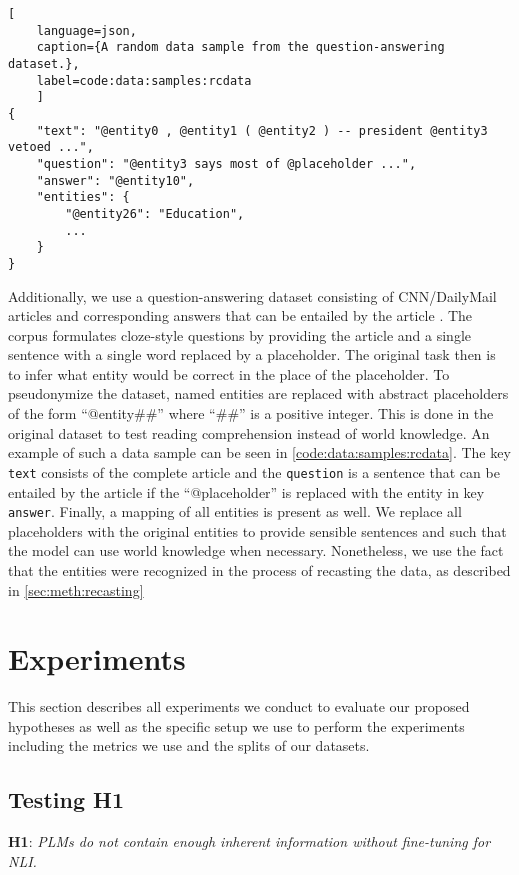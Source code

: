 \begin{lstlisting}[
    language=json,
    caption={A random data sample from the question-answering dataset.},
    label=code:data:samples:rcdata
    ]
{
    "text": "@entity0 , @entity1 ( @entity2 ) -- president @entity3 vetoed ...",
    "question": "@entity3 says most of @placeholder ...",
    "answer": "@entity10",
    "entities": {
        "@entity26": "Education",
        ...
    }
}
\end{lstlisting}

Additionally, we use a question-answering dataset consisting of CNN/DailyMail articles and corresponding answers that can be entailed by the article \cite{cnn1}. The corpus formulates cloze-style questions by providing the article and a single sentence with a single word replaced by a placeholder. The original task then is to infer what entity would be correct in the place of the placeholder. To pseudonymize the dataset, named entities are replaced with abstract placeholders of the form \enquote{@entity\#\#} where \enquote{\#\#} is a positive integer. This is done in the original dataset to test reading comprehension instead of world knowledge. An example of such a data sample can be seen in \autoref{code:data:samples:rcdata}. The key \texttt{text} consists of the complete article and the \texttt{question} is a sentence that can be entailed by the article if the \enquote{@placeholder} is replaced with the entity in key \texttt{answer}. Finally, a mapping of all entities is present as well. We replace all placeholders with the original entities to provide sensible sentences and such that the model can use world knowledge when necessary. Nonetheless, we use the fact that the entities were recognized in the process of recasting the data, as described in \autoref{sec:meth:recasting}

\section{Experiments} \label{sec:experiments}
This section describes all experiments we conduct to evaluate our proposed hypotheses as well as the specific setup we use to perform the experiments including the metrics we use and the splits of our datasets.

\subsection{Testing H1}
\textbf{H1}: \textit{\acp{PLM} do not contain enough inherent information without fine-tuning for \ac{NLI}.}

